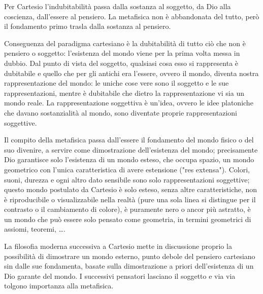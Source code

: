 Per Cartesio l'indubitabilità passa dalla sostanza al soggetto, da Dio alla coscienza, dall'essere al pensiero. La metafisica non è abbandonata del tutto, però il fondamento primo trasla dalla sostanza al pensiero.

Conseguenza del paradigma cartesiano è la dubitabilità di tutto ciò che non è pensiero o soggetto: l'esistenza del mondo viene per la prima volta messa in dubbio. Dal punto di vista del soggetto, qualsiasi cosa esso si rappresenta è dubitabile e quello che per gli antichi era l'essere, ovvero il mondo, diventa nostra rappresentazione del mondo: le uniche cose vere sono il soggetto e le sue rappresentazioni, mentre è dubitabile che dietro la rappresentazione vi sia un mondo reale. La rappresentazione soggettiva è un'idea, ovvero le idee platoniche che davano sostanzialità al mondo, sono diventate proprie rappresentazioni soggettive.

Il compito della metafisica passa dall'essere il fondamento del mondo fisico o del suo divenire, a servire come dimostrazione dell'esistenza del mondo; precisamente Dio garantisce solo l'esistenza di un mondo esteso, che occupa spazio, un mondo geometrico con l'unica caratteristica di avere estensione ("res extensa"). Colori, suoni, durezza e ogni altro dato sensibile sono solo rappresentazioni soggettive; questo mondo postulato da Cartesio è solo esteso, senza altre caratteristiche, non è riproducibile o visualizzabile nella realtà (pure una sola linea si distingue per il contrasto o il cambiamento di colore), è puramente nero o ancor più astratto, è un mondo che può essere solo pensato come geometria, in termini geometrici di assiomi, teoremi, \dots.

La filosofia moderna successiva a Cartesio mette in discussione proprio la possibilità di dimostrare un mondo esterno, punto debole del pensiero cartesiano sin dalle sue fondamenta, basate sulla dimostrazione a priori dell'esistenza di un Dio garante del mondo. I successivi pensatori lasciano il soggetto e via via tolgono importanza alla metafisica.

